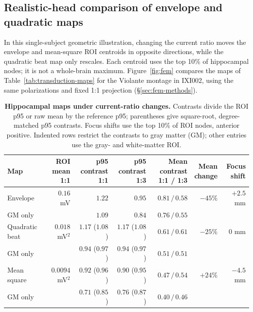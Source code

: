 \documentclass[a4paper]{article}
\begin{document}
\subsection{Realistic-head comparison of envelope and quadratic maps}\label{sec:fem-results}
In this single-subject geometric illustration, changing the current ratio
moves the envelope and mean-square ROI centroids in opposite directions,
while the quadratic beat map only rescales. Each centroid uses the top 10\%
of hippocampal nodes; it is not a whole-brain maximum.
Figure~\ref{fig:fem} compares the maps of Table~\ref{tab:transduction-maps}
for the Violante montage in IXI002, using the same polarizations and fixed
1:1 projection (\S\ref{sec:fem-methods}).

\begin{table}[htbp]
\centering\small
\caption{\textbf{Hippocampal maps under current-ratio changes.}
Contrasts divide the ROI p95 or raw mean by the reference p95; parentheses
give square-root, degree-matched p95 contrasts. Focus shifts use the top
10\% of ROI nodes, anterior positive. Indented rows restrict the contrasts
to gray matter (GM); other entries use the gray- and white-matter ROI.}
\label{tab:fem-summary}
\setlength{\tabcolsep}{4pt}
\begin{tabular}{@{}lrrrrrr@{}}
\toprule
Map & \shortstack{ROI mean\\1:1} & \shortstack{p95 contrast\\1:1} &
\shortstack{p95 contrast\\1:3} & \shortstack{Mean contrast\\1:1 / 1:3} &
\shortstack{Mean\\change} & \shortstack{Focus\\shift}\\
\midrule
Envelope & $0.16$ mV & $1.22$ & $0.95$ & $0.81\,/\,0.58$ & $-45\%$ & $+2.5$ mm\\
\quad GM only & & $1.09$ & $0.84$ & $0.76\,/\,0.55$ & & \\
Quadratic beat & $0.018$ mV$^2$ & $1.17$ ($1.08$) & $1.17$ ($1.08$) & $0.61\,/\,0.61$ & $-25\%$ & $0$ mm\\
\quad GM only & & $0.94$ ($0.97$) & $0.94$ ($0.97$) & $0.51\,/\,0.51$ & & \\
Mean square & $0.0094$ mV$^2$ & $0.92$ ($0.96$) & $0.90$ ($0.95$) & $0.47\,/\,0.54$ & $+24\%$ & $-4.5$ mm\\
\quad GM only & & $0.71$ ($0.85$) & $0.76$ ($0.87$) & $0.40\,/\,0.46$ & & \\
\bottomrule
\end{tabular}
\end{table}
\end{document}
